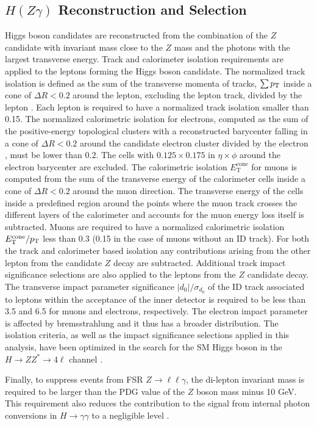 \subsection{$H(Z\gamma)$ Reconstruction and Selection}
Higgs boson candidates are reconstructed from the combination of the $Z$ candidate
with invariant mass close to the $Z$ mass and the photons with the largest transverse
energy. Track and calorimeter isolation requirements are applied to the leptons
forming the Higgs boson candidate. The normalized track isolation is defined as the 
sum of the transverse momenta of tracks, $\sum p_{\mathrm{T}}$ inside a cone of $\Delta R < 0.2$
around the lepton, excluding the lepton track, divided by the lepton \pt. Each lepton
is required to have a normalized track isolation smaller than 0.15. The normalized
calorimetric isolation for electrons, computed as the sum of the positive-energy
topological clusters with a reconstructed barycenter falling in a cone of
$\Delta R < 0.2$ around the candidate electron cluster divided by the electron \et,
must be lower than 0.2. The cells with $0.125 \times 0.175$ in $\eta \times \phi$
around the electron barycenter are excluded. The calorimetric isolation 
$E_{\text{T}}^{\text{cone}}$ for muons is computed from the sum of the transverse
energy of the calorimeter cells inside a cone of $\Delta R < 0.2$ around the muon
direction. The transverse energy of the cells inside a predefined region
around the points where the muon track crosses the different layers of the
calorimeter and accounts for the muon energy loss itself is subtracted. Muons
are required to have a normalized calorimetric isolation 
$E_{\text{T}}^{\text{cone}}/p_{\mathrm{T}}$ less than 0.3 (0.15 in the case of muons without an
ID track). For both the track and calorimeter based isolation any contributions
arising from the other lepton from the candidate $Z$ decay are subtracted.
Additional track impact significance selections are also applied to the leptons
from the $Z$ candidate decay. The transverse impact parameter significance 
$|d_0|/\sigma_{d_0}$ of the ID track associated to leptons within the acceptance of
the inner detector is required to be less than 3.5 and 6.5 for muons and electrons,
respectively. The electron impact parameter is affected by bremsstrahlung and it
thus has a broader distribution. The isolation criteria, as well as the impact
significance selections applied in this analysis, have been optimized in the search
for the SM Higgs boson in the $H \to ZZ^* \to 4\ell$ channel 
\cite{ATLAS-CONF-2012-169}.

Finally, to suppress events from FSR $Z \to \ell\ell\gamma$, the di-lepton
invariant mass is required to be larger than the PDG value of the $Z$ boson mass
minus 10 GeV. This requirement also reduces the contribution to the signal
from internal photon conversions in $H \to \gamma\gamma$ to a negligible level 
\cite{Firan:1032388}.

